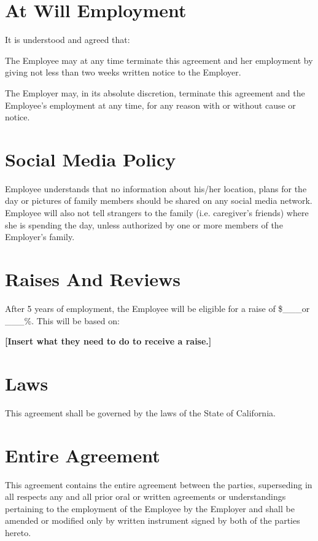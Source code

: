 \documentclass[]{article}
\begin{document}
\section{At Will Employment}

It is understood and agreed that:

The Employee may at any time terminate this agreement and her employment by giving not less than two weeks written notice to the Employer.

The Employer may, in its absolute discretion, terminate this agreement and the Employee's employment at any time, for any reason with or without cause or notice.

\section{Social Media Policy}

Employee understands that no information about his/her location, plans for the day or pictures of family members should be shared on any social media network. Employee will also not tell strangers to the family (i.e.  caregiver's friends) where she is spending the day, unless authorized by one or more members of the Employer's family.  

\section{Raises And Reviews}

After 5 years of employment, the Employee will be eligible for a raise
of \$\_\_\_or \_\_\_\%. This will be based on:

\textbf{{[}Insert what they need to do to receive a raise.{]}}

\section{Laws}

This agreement shall be governed by the laws of the State of California.

\section{Entire Agreement}

This agreement contains the entire agreement between the parties, superseding in all respects any and all prior oral or written agreements or understandings pertaining to the employment of the Employee by the Employer and shall be amended or modified only by written instrument signed by both of the parties hereto.  
\end{document}
